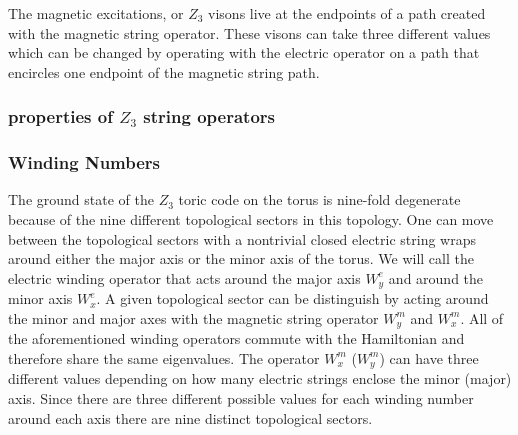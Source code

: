 \documentclass[aps,floatfix,11pt,twocolumn]{revtex4-1}
\begin{document}
            The magnetic excitations, or $Z_3$ visons live at the endpoints of a path created with the magnetic
            string operator. These visons can take three different values which can be changed by
            operating with the electric operator on a path that encircles one endpoint of the
            magnetic string path. 


        \subsubsection{properties of $Z_3$ string operators}

        \subsubsection{Winding Numbers}

            The ground state of the $Z_3$ toric code on the torus is nine-fold degenerate because of
            the nine different topological sectors in this topology. One can move between the
            topological sectors with a nontrivial closed electric string wraps around either
            the major axis or the minor axis of the torus. We will call the electric winding
            operator that acts around the major axis $W^e_y$ and around the minor axis $W^e_x$.
            A given topological sector can be distinguish 
            by acting around the minor and major axes with the magnetic string operator $W^m_y$ and
            $W^m_x$. All of the aforementioned winding operators commute with the Hamiltonian and
            therefore share the same eigenvalues. The operator $W^m_{x}$ ($W^m_{y}$) can 
            have three different values depending on how many electric strings enclose the minor
            (major) axis. Since there are three different
            possible values for each winding number around each axis there are nine distinct
            topological sectors.
\end{document}
